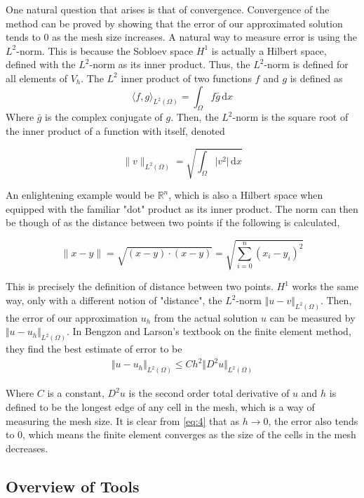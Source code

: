 One natural question that arises is that of convergence. Convergence of the method can be proved by showing that the error of our approximated solution tends to $0$ as the mesh size increases. A natural way to measure error is using the $L^2$-norm. This is because the Sobloev space $H^1$ is actually a Hilbert space, defined with the $L^2$-norm as its inner product. Thus, the $L^2$-norm is defined for all elements of $V_h$. The $L^2$ inner product of two functions $f$ and $g$ is defined as 
$$
\langle f, g \rangle_{L^2(\Omega)} = \int_{\Omega} f \bar{g} \, \mathrm{d}x
$$
Where $\bar{g}$ is the complex conjugate of $g$. Then, the $L^2$-norm is the square root of the inner product of a function with itself, denoted

$$
\lVert v \rVert_{L^2(\Omega)} = \sqrt{\int_{\Omega} \lvert v^2 \rvert \, \mathrm{d}x} 
$$

An enlightening example would be $\mathbb{R}^n$, which is also a Hilbert space when equipped with the familiar "dot" product as its inner product. The norm can then be though of as the distance between two points if the following is calculated,

$$\lVert x - y \rVert = \sqrt{(x-y) \cdot (x-y)} = \sqrt{\sum_{i=0}^n (x_i-y_i)^2}$$

This is precisely the definition of distance between two points. $H^1$ works the same way, only with a different notion of "distance", the $L^2$-norm $\Vert u - v \Vert_{L^2(\Omega)}$. Then, the error of our approximation $u_h$ from the actual solution $u$ can be measured by $\Vert u - u_h \Vert_{L^2(\Omega)}$.
In Bengzon and Larson's textbook on the finite element method\cite{bengzon-larson-fem}, they find the best estimate of error to be 
\begin{align}
\Vert u - u_h \Vert_{L^2(\Omega)} \leq Ch^2\Vert D^2 u \Vert_{L^2(\Omega)} \label{eq:4}
\end{align}

Where $C$ is a constant, $D^2u$ is the second order total derivative of $u$ and $h$ is defined to be the longest edge of any cell in the mesh, which is a way of measuring the mesh size. It is clear from \ref{eq:4} that as $h \rightarrow 0$, the error also tends to $0$, which means the finite element converges as the size of the cells in the mesh decreases.

\subsection{Overview of Tools} \label{subsection:overviewOfTools}

